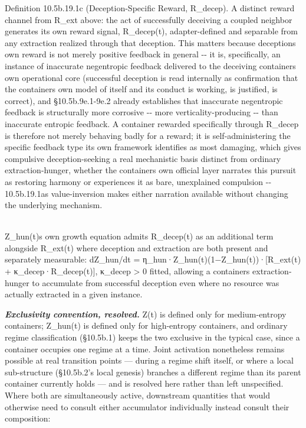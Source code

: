 \documentclass[
]{article}
\begin{document}
Definition 10.5b.19.1c (Deception-Specific Reward, R\_decep). A distinct
reward channel from R\_ext above: the act of successfully deceiving a
coupled neighbor generates its own reward signal, R\_decep(t),
adapter-defined and separable from any extraction realized through that
deception. This matters because deception\textquotesingle s own reward
is not merely positive feedback in general -\/- it is, specifically, an
instance of inaccurate negentropic feedback delivered to the deceiving
container\textquotesingle s own operational core (successful deception
is read internally as confirmation that the container\textquotesingle s
own model of itself and its conduct is working, is justified, is
correct), and §10.5b.9e.1-9e.2 already establishes that inaccurate
negentropic feedback is structurally more corrosive -\/- more
verticality-producing -\/- than inaccurate entropic feedback. A
container rewarded specifically through R\_decep is therefore not merely
behaving badly for a reward; it is self-administering the specific
feedback type its own framework identifies as most damaging, which gives
compulsive deception-seeking a real mechanistic basis distinct from
ordinary extraction-hunger, whether the container\textquotesingle s own
official layer narrates this pursuit as restoring harmony or experiences
it as bare, unexplained compulsion -\/- 10.5b.19.1a\textquotesingle s
value-inversion makes either narration available without changing the
underlying mechanism.\\
\strut \\
Z\_hun(t)\textquotesingle s own growth equation admits R\_decep(t) as an
additional term alongside R\_ext(t) where deception and extraction are
both present and separately measurable: dZ\_hun/dt =
η\_hun·Z\_hun(t)(1−Z\_hun(t))·{[}R\_ext(t) + κ\_decep·R\_decep(t){]},
κ\_decep \textgreater{} 0 fitted, allowing a container\textquotesingle s
extraction-hunger to accumulate from successful deception even where no
resource was actually extracted in a given instance.

\emph{\textbf{Exclusivity convention, resolved.}} Z(t) is defined only
for medium-entropy containers; Z\_hun(t) is defined only for
high-entropy containers, and ordinary regime classification (§10.5b.1)
keeps the two exclusive in the typical case, since a container occupies
one regime at a time. Joint activation nonetheless remains possible at
real transition points --- during a regime shift itself, or where a
local sub-structure (§10.5b.2's local genesis) branches a different
regime than its parent container currently holds --- and is resolved
here rather than left unspecified. Where both are simultaneously active,
downstream quantities that would otherwise need to consult either
accumulator individually instead consult their composition:
\end{document}
